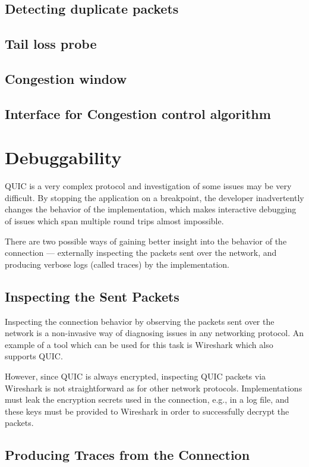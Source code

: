 \subsection{Detecting duplicate packets}
\subsection{Tail loss probe}
\subsection{Congestion window}
\subsection{Interface for Congestion control algorithm}

\section{Debuggability}

QUIC is a very complex protocol and investigation of some issues may be very difficult. By stopping
the application on a breakpoint, the developer inadvertently changes the behavior of the
implementation, which makes interactive debugging of issues which span multiple round trips almost
impossible.

There are two possible ways of gaining better insight into the behavior of the connection ---
externally inspecting the packets sent over the network, and producing verbose logs (called traces)
by the implementation.

\subsection{Inspecting the Sent Packets}

Inspecting the connection behavior by observing the packets sent over the network is a non-invasive
way of diagnosing issues in any networking protocol. An example of a tool which can be used for this
task is Wireshark \cite{web:wireshark} which also supports QUIC.

However, since QUIC is always encrypted, inspecting QUIC packets via Wireshark is not
straightforward as for other network protocols. Implementations must leak the encryption secrets
used in the connection, e.g., in a log file, and these keys must be provided to Wireshark in order
to successfully decrypt the packets.

\subsection{Producing Traces from the Connection}

